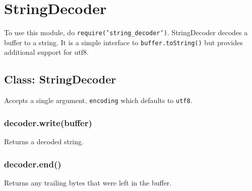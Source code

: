 \section{StringDecoder}

\begin{Shaded}
\begin{Highlighting}[]
\NormalTok{: } 
\end{Highlighting}
\end{Shaded}

To use this module, do \texttt{require('string\_decoder')}.
StringDecoder decodes a buffer to a string. It is a simple interface to
\texttt{buffer.toString()} but provides additional support for utf8.

\begin{Shaded}
\begin{Highlighting}[]
 \NormalTok{;}
  \NormalTok{);}

  \NormalTok{Buffer([}\NormalTok{, }\NormalTok{]);}
\NormalTok{(}

  \NormalTok{Buffer([}\NormalTok{, }\NormalTok{, }\NormalTok{]);}
\NormalTok{(}
\end{Highlighting}
\end{Shaded}

\subsection{Class: StringDecoder}

Accepts a single argument, \texttt{encoding} which defaults to
\texttt{utf8}.

\subsubsection{decoder.write(buffer)}

Returns a decoded string.

\subsubsection{decoder.end()}

Returns any trailing bytes that were left in the buffer.
